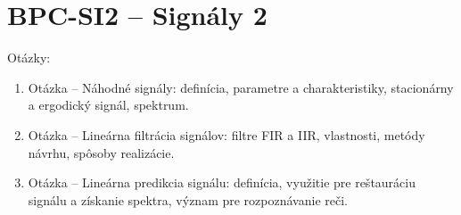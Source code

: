 %
%
%
\graphicspath{{./Obrazky/SI2/}}

\newcommand{\imgplaceholder}[1]{%
  \begin{figure}[H]
    \centering
    \fbox{\parbox{0.7\textwidth}{\centering\vspace{1cm}
    \texttt{[OBRÁZOK: #1]}\vspace{1cm}}}
    \caption{#1}
  \end{figure}
}

%
%


\part{BPC-SI2 -- Signály 2}

\begin{huge}
  Otázky:
  \newline
\end{huge}

\begin{enumerate}
  \item Otázka -- Náhodné signály: definícia, parametre a charakteristiky,
        stacionárny a ergodický signál, spektrum.
  \item Otázka -- Lineárna filtrácia signálov: filtre FIR a IIR,
        vlastnosti, metódy návrhu, spôsoby realizácie.
  \item Otázka -- Lineárna predikcia signálu: definícia, využitie pre
        reštauráciu signálu a získanie spektra, význam pre rozpoznávanie reči.
\end{enumerate}

